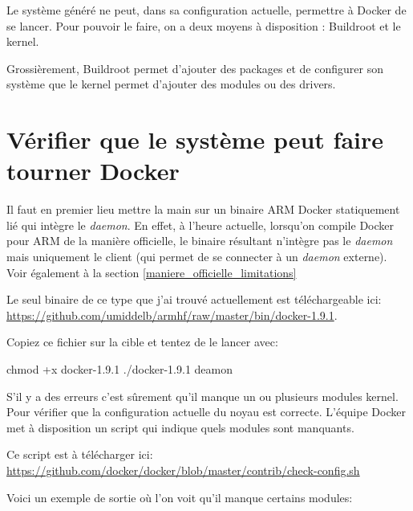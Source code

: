 \documentclass[11pt,a4paper,oneside]{report}
\begin{document}
Le système généré ne peut, dans sa configuration actuelle, permettre à Docker de se lancer. Pour pouvoir le faire, on a deux moyens à disposition : Buildroot et le kernel.

Grossièrement, Buildroot permet d'ajouter des packages et de configurer son système      que le kernel permet d'ajouter des modules ou des drivers.

\section{Vérifier que le système peut faire tourner Docker}

Il faut en premier lieu mettre la main sur un binaire ARM Docker statiquement lié qui intègre le \emph{daemon}. En effet, à l'heure actuelle, lorsqu'on compile Docker pour ARM de la manière officielle, le binaire résultant n'intègre pas le \emph{daemon} mais uniquement le client (qui permet de se connecter à un \emph{daemon} externe). Voir également à la section \ref{maniere_officielle_limitations}

Le seul binaire de ce type que j'ai trouvé actuellement est téléchargeable ici: \url{https://github.com/umiddelb/armhf/raw/master/bin/docker-1.9.1}\label{binaire_arm}.

Copiez ce fichier sur la cible et tentez de le lancer avec:

\begin{bashcode}
chmod +x docker-1.9.1
./docker-1.9.1 deamon
\end{bashcode}

S'il y a des erreurs c'est sûrement qu'il manque un ou plusieurs modules kernel. Pour vérifier que la configuration actuelle du noyau est correcte. L'équipe Docker met à disposition un script qui indique quels modules sont manquants.

Ce script est à télécharger ici: \url{https://github.com/docker/docker/blob/master/contrib/check-config.sh}

\newpage
Voici un exemple de sortie où l'on voit qu'il manque certains modules:
\end{document}
